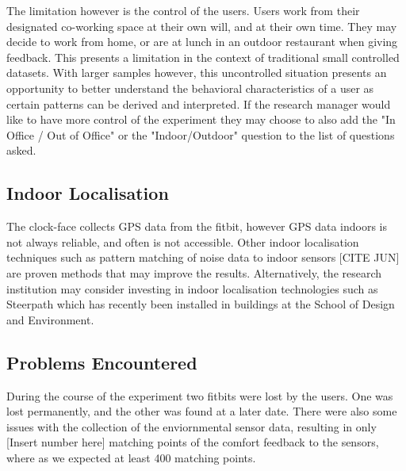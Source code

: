 The limitation however is the control of the users. Users work from their designated co-working space at their own will, and at their own time. They may decide to work from home, or are at lunch in an outdoor restaurant when giving feedback. This presents a limitation in the context of traditional small controlled datasets. With larger samples however, this uncontrolled situation presents an opportunity to better understand the behavioral characteristics of a user as certain patterns can be derived and interpreted. If the research manager would like to have more control of the experiment they may choose to also add the "In Office / Out of Office" or the "Indoor/Outdoor" question to the list of questions asked.







\subsection{Indoor Localisation}

The clock-face collects GPS data from the fitbit, however GPS data indoors is not always reliable, and often is not accessible. Other indoor localisation techniques such as pattern matching of noise data to indoor sensors [CITE JUN] are proven methods that may improve the results. Alternatively, the research institution may consider investing in indoor localisation technologies such as Steerpath which has recently been installed in buildings at the School of Design and Environment. 



\subsection{Problems Encountered}

During the course of the experiment two fitbits were lost by the users. One was lost permanently, and the other was found at a later date. There were also some issues with the collection of the enviornmental sensor data, resulting in only [Insert number here] matching points of the comfort feedback to the sensors, where as we expected at least 400 matching points.





